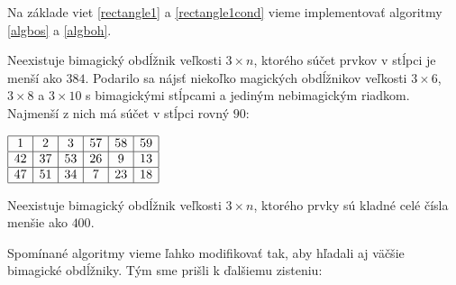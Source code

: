 

Na základe viet \ref{rectangle1} a \ref{rectangle1cond} vieme implementovať algoritmy \ref{algbos} a \ref{algboh}.

\begin{result} Neexistuje bimagický obdĺžnik veľkosti $3 \times n$, ktorého súčet prvkov v stĺpci je menší ako $384$. Podarilo sa nájsť niekoľko magických obdĺžnikov veľkosti $3 \times 6$, $3 \times 8$ a $3 \times 10$ s bimagickými stĺpcami a jediným nebimagickým riadkom. Najmenší z nich má súčet v stĺpci rovný $90$:
\end{result}

\begin{center}
$\begin{array}{ |c|c|c|c|c|c| } 
\hline
1 & 2 & 3 & 57 & 58 & 59 \\ 
\hline
42 & 37 & 53 & 26 & 9 & 13 \\ 
\hline
47 & 51 & 34 & 7 & 23 & 18 \\ 
\hline
\end{array}$
\end{center}

\begin{result} Neexistuje bimagický obdĺžnik veľkosti $3 \times n$, ktorého prvky sú kladné celé čísla menšie ako $400$.
\end{result} 

Spomínané algoritmy vieme ľahko modifikovať tak, aby hľadali aj väčšie bimagické obdĺžniky. Tým sme prišli k ďalšiemu zisteniu:

